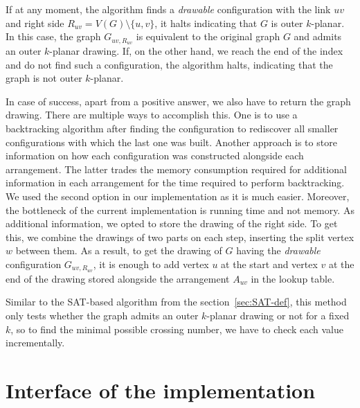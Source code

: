 If at any moment, the algorithm finds a \emph{drawable} configuration with the link \(uv\) and right side \(R_{uv} = V(G)\setminus\{u, v\}\), it halts indicating that \(G\) is outer \(k\)-planar. In this case, the graph \(G_{uv, R_{uv}}\) is equivalent to the original graph \(G\) and admits an outer \(k\)-planar drawing. If, on the other hand, we reach the end of the index and do not find such a configuration, the algorithm halts, indicating that the graph is not outer \(k\)-planar.

In case of success, apart from a positive answer, we also have to return the graph drawing. There are multiple ways to accomplish this. One is to use a backtracking algorithm after finding the configuration to rediscover all smaller configurations with which the last one was built. Another approach is to store information on how each configuration was constructed alongside each arrangement. The latter trades the memory consumption required for additional information in each arrangement for the time required to perform backtracking. We used the second option in our implementation as it is much easier. Moreover, the bottleneck of the current implementation is running time and not memory. As additional information, we opted to store the drawing of the right side. To get this, we combine the drawings of two parts on each step, inserting the split vertex \(w\) between them. As a result, to get the drawing of \(G\) having the \emph{drawable} configuration \(G_{uv, R_{uv}}\), it is enough to add vertex \(u\) at the start and vertex \(v\) at the end of the drawing stored alongside the arrangement \(A_{uv}\) in the lookup table.

Similar to the SAT-based algorithm from the section~\ref{sec:SAT-def}, this method only tests whether the graph admits an outer \(k\)-planar drawing or not for a fixed \(k\), so to find the minimal possible crossing number, we have to check each value incrementally.


\section{Interface of the implementation}

